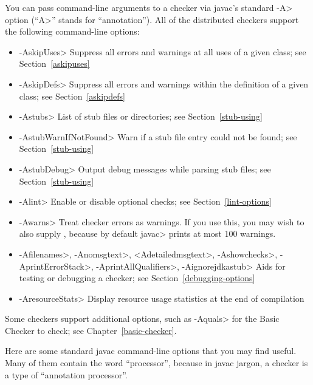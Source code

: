 You can pass command-line arguments to a checker via javac's standard \<-A>
option (``\<A>'' stands for ``annotation'').  All of the distributed
checkers support the following command-line options:

\begin{itemize}
\item \<-AskipUses> Suppress all errors and warnings at all uses of a
  given class; see Section~\ref{askipuses}
\item \<-AskipDefs> Suppress all errors and warnings within the definition of a
  given class; see Section~\ref{askipdefs}
\item \<-Astubs> List of stub files or directories; see Section~\ref{stub-using}
\item \<-AstubWarnIfNotFound> Warn if a stub file entry could not be found; see Section~\ref{stub-using}
\item \<-AstubDebug> Output debug messages while parsing stub files; see Section~\ref{stub-using}
\item \<-Alint> Enable or disable optional checks; see Section~\ref{lint-options}
\item \<-Awarns> Treat checker errors as warnings.  If you use this, you
  may wish to also supply , because by default
  \<javac> prints at most 100 warnings.
\item \<-Afilenames>, \<-Anomsgtext>, <\-Adetailedmsgtext>, \<-Ashowchecks>, \<-AprintErrorStack>,
  \<-AprintAllQualifiers>, \<-Aignorejdkastub>
  Aids for testing or debugging a checker; see Section~\ref{debugging-options}
\item \<-AresourceStats> Display resource usage statistics at the end of compilation
\end{itemize}

\noindent
Some checkers support additional options, such as \<-Aquals> for the Basic
Checker to check; see Chapter~\ref{basic-checker}.


Here are some standard javac command-line options that you may find useful.
Many of them contain the word ``processor'', because in javac jargon, a
checker is a type of ``annotation processor''.


